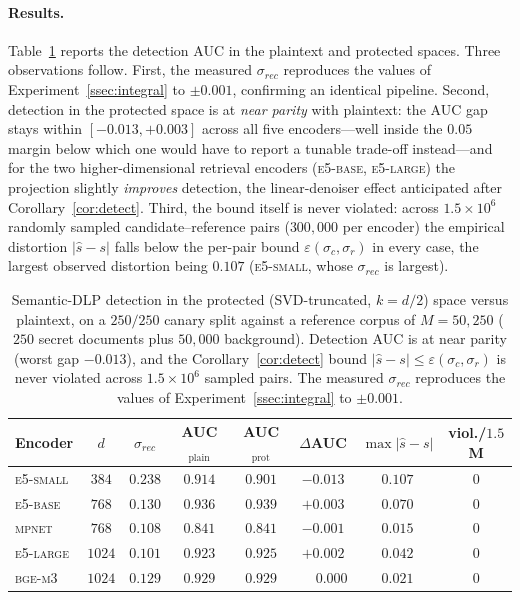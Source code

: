 \documentclass[11pt,a4paper]{article}
\begin{document}
\paragraph{Results.} Table~\ref{tab:dlp} reports the detection AUC in the
plaintext and protected spaces. Three observations follow. First, the
measured $\sigma_{rec}$ reproduces the values of
Experiment~\ref{ssec:integral} to $\pm0.001$, confirming an identical
pipeline. Second, detection in the protected space is at \emph{near
parity} with plaintext: the AUC gap stays within $[-0.013,+0.003]$ across
all five encoders---well inside the $0.05$ margin below which one would
have to report a tunable trade-off instead---and for the two
higher-dimensional retrieval encoders (\textsc{e5-base},
\textsc{e5-large}) the projection slightly \emph{improves} detection, the
linear-denoiser effect anticipated after Corollary~\ref{cor:detect}.
Third, the bound itself is never violated: across $1.5\times10^{6}$
randomly sampled candidate--reference pairs ($300{,}000$ per encoder) the
empirical distortion $|\hat s - s|$ falls below the per-pair bound
$\varepsilon(\sigma_c,\sigma_r)$ in every case, the largest observed
distortion being $0.107$ (\textsc{e5-small}, whose $\sigma_{rec}$ is
largest).

\begin{table}[tb]\centering
\caption{Semantic-DLP detection in the protected (SVD-truncated, $k=d/2$)
space versus plaintext, on a $250/250$ canary split against a reference
corpus of $M = 50{,}250$ ($250$ secret documents plus $50{,}000$
background). Detection AUC is at near parity (worst gap $-0.013$), and the
Corollary~\ref{cor:detect} bound $|\hat s - s|\le
\varepsilon(\sigma_c,\sigma_r)$ is never violated across
$1.5\times10^{6}$ sampled pairs. The measured $\sigma_{rec}$ reproduces
the values of Experiment~\ref{ssec:integral} to $\pm0.001$.}
\label{tab:dlp}
\small
\begin{tabular}{lccccccc}
\toprule
Encoder & $d$ & $\sigma_{rec}$ & AUC$_{\mathrm{plain}}$ & AUC$_{\mathrm{prot}}$ & $\Delta$AUC & $\max|\hat s-s|$ & viol./$1.5$M \\
\midrule
\textsc{e5-small} & $384$  & $0.238$ & $0.914$ & $0.901$ & $-0.013$ & $0.107$ & $0$ \\
\textsc{e5-base}  & $768$  & $0.130$ & $0.936$ & $0.939$ & $+0.003$ & $0.070$ & $0$ \\
\textsc{mpnet}    & $768$  & $0.108$ & $0.841$ & $0.841$ & $-0.001$ & $0.015$ & $0$ \\
\textsc{e5-large} & $1024$ & $0.101$ & $0.923$ & $0.925$ & $+0.002$ & $0.042$ & $0$ \\
\textsc{bge-m3}   & $1024$ & $0.129$ & $0.929$ & $0.929$ & $\phantom{-}0.000$ & $0.021$ & $0$ \\
\bottomrule
\end{tabular}
\end{table}
\end{document}
